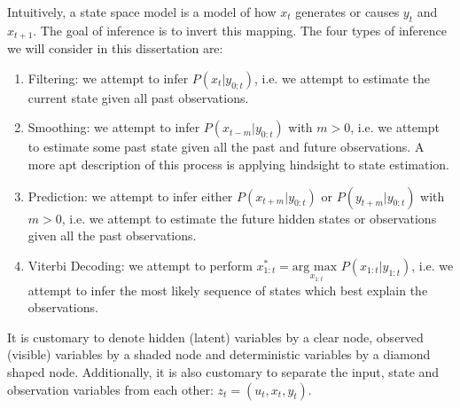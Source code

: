 Intuitively, a state space model is a model of how $x_t$ generates or causes $y_t$ and $x_{t+1}$. The goal of inference is to invert this mapping. The four types of inference we will consider in this dissertation are:
\begin{enumerate}
\item
Filtering: we attempt to infer $P(x_t|y_{0:t})$, i.e. we attempt to estimate the current state given all past observations.
\item
Smoothing: we attempt to infer $P(x_{t-m}|y_{0:t})$ with $m > 0$, i.e. we attempt to estimate some past state given all the past and future observations. A more apt description of this process is applying hindsight to state estimation.
\item
Prediction: we attempt to infer either $P(x_{t+m}|y_{0:t})$ or $P(y_{t+m}|y_{0:t})$ with $m>0$, i.e. we attempt to estimate the future hidden states or observations given all the past observations.
\item
Viterbi Decoding: we attempt to perform $x_{1:t}^* = \underset{x_{1:t}}{\text{arg max }} P(x_{1:t}|y_{1:t})$, i.e. we attempt to infer the most likely sequence of states which best explain the observations.
\end{enumerate}
It is customary to denote hidden (latent) variables by a clear node, observed (visible) variables by a shaded node and deterministic variables by a diamond shaped node. Additionally, it is also customary to separate the input, state and observation variables from each other: $z_t = (u_t, x_t, y_t)$. 

